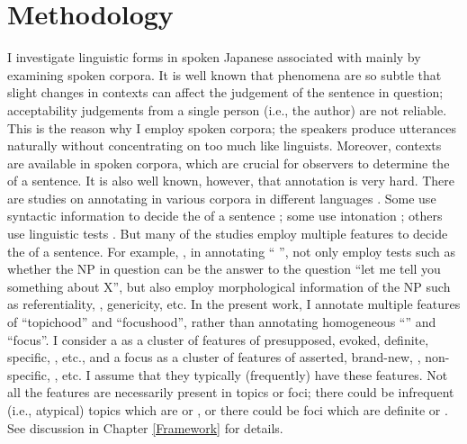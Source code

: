 \section{Methodology}\label{IntroMethodology}

I investigate linguistic forms in spoken Japanese associated with
mainly by examining spoken corpora.
It is well known that  phenomena are so subtle
that slight changes in contexts can affect the judgement of the sentence in question;
acceptability judgements from a single person (i.e., the author) are not reliable.
This is the reason why I employ spoken corpora;
the speakers produce utterances naturally without concentrating on  too much like linguists.
Moreover, contexts are available in spoken corpora,
which are crucial for observers to determine the  of a sentence.
It is also well known, however,
that  annotation is very hard.
There are studies on annotating  in various corpora in different languages
\cite{hajicovaetal00,calhounetal05,gotzeetal07,ritzetal08,chiarcosetal11}.
Some use syntactic information to decide the  of a sentence \cite{hajicovaetal00};
some use intonation \cite{calhounetal05};
others use linguistic tests \cite{gotzeetal07,chiarcosetal11}.
But many of the studies employ multiple features to decide the  of a sentence.
For example,
,
in annotating `` '',
not only employ tests such as whether the NP in question can be the answer to the question ``let me tell you something about X'',
but also employ morphological information of the NP
such as referentiality, , genericity, etc.
In the present work, I annotate multiple features of ``topichood'' and ``focushood'',
rather than annotating homogeneous ``'' and ``focus''.
I consider a  as a cluster of features of presupposed, evoked, definite, specific, , etc.,
and a focus as a cluster of features of asserted, brand-new, , non-specific, , etc.
I assume that they typically (frequently) have these features.
Not all the features are necessarily present in topics or foci;
there could be infrequent (i.e., atypical) topics which are  or ,
or there could be foci which are definite or .
See discussion in Chapter \ref{Framework} for details.

